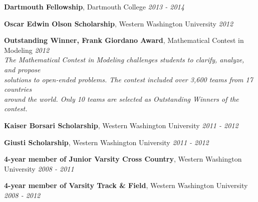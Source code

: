 \documentclass[9pt]{article}
\newenvironment{changemargin}[2]{%
  \begin{list}{}{%
    \setlength{\topsep}{0pt}%
    \setlength{\leftmargin}{#1}%
    \setlength{\rightmargin}{#2}%
    \setlength{\listparindent}{\parindent}%
    \setlength{\itemindent}{\parindent}%
    \setlength{\parsep}{\parskip}%
  }%
  \item[]}{\end{list}
}
\newenvironment{body} {
	\vspace*{-16pt}
	\begin{changemargin}{-0.20in}{-0.5in}
  }	
	{\end{changemargin}
}
\begin{document}
\begin{body}
	\vspace{14pt}
	
	\textbf{Dartmouth Fellowship}, Dartmouth College \hfill{} \emph{2013 - 2014}\\
	\smallskip
		
	\textbf{Oscar Edwin Olson Scholarship}, Western Washington University \hfill{} \emph{2012}\\
	\smallskip
	
	\textbf{Outstanding Winner, Frank Giordano Award}, Mathematical Contest in Modeling \hfill{} \emph{2012}\\
	\hspace{5mm}\textit{The Mathematical Contest in Modeling challenges students to clarify, analyze, and propose}\\
	\hspace{5mm}\textit{solutions to open-ended problems. The contest included over 3,600 teams from 17 countries}\\
	\hspace{5mm}\textit{around the world. Only 10 teams are selected as Outstanding Winners of the contest.}\\
	\smallskip
	
	\textbf{Kaiser Borsari Scholarship}, Western Washington University \hfill{} \emph{2011 - 2012}\\
	\smallskip
	
	\textbf{Giusti Scholarship}, Western Washington University \hfill{} \emph{2011 - 2012}\\
	\smallskip
	
	\textbf{4-year member of Junior Varsity Cross Country}, Western Washington University \hfill{} \emph{2008 - 2011}\\
	\smallskip
	
	\textbf{4-year member of Varsity Track \& Field}, Western Washington University \hfill{} \emph{2008 - 2012}\\

\end{body}
\end{document}
